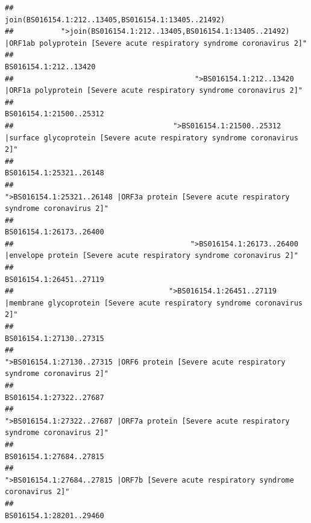 \documentclass[
]{article}
\begin{document}
\begin{verbatim}
##                                                                                    join(BS016154.1:212..13405,BS016154.1:13405..21492) 
##           ">join(BS016154.1:212..13405,BS016154.1:13405..21492) |ORF1ab polyprotein [Severe acute respiratory syndrome coronavirus 2]" 
##                                                                                                                  BS016154.1:212..13420 
##                                          ">BS016154.1:212..13420 |ORF1a polyprotein [Severe acute respiratory syndrome coronavirus 2]" 
##                                                                                                                BS016154.1:21500..25312 
##                                     ">BS016154.1:21500..25312 |surface glycoprotein [Severe acute respiratory syndrome coronavirus 2]" 
##                                                                                                                BS016154.1:25321..26148 
##                                            ">BS016154.1:25321..26148 |ORF3a protein [Severe acute respiratory syndrome coronavirus 2]" 
##                                                                                                                BS016154.1:26173..26400 
##                                         ">BS016154.1:26173..26400 |envelope protein [Severe acute respiratory syndrome coronavirus 2]" 
##                                                                                                                BS016154.1:26451..27119 
##                                    ">BS016154.1:26451..27119 |membrane glycoprotein [Severe acute respiratory syndrome coronavirus 2]" 
##                                                                                                                BS016154.1:27130..27315 
##                                             ">BS016154.1:27130..27315 |ORF6 protein [Severe acute respiratory syndrome coronavirus 2]" 
##                                                                                                                BS016154.1:27322..27687 
##                                            ">BS016154.1:27322..27687 |ORF7a protein [Severe acute respiratory syndrome coronavirus 2]" 
##                                                                                                                BS016154.1:27684..27815 
##                                                    ">BS016154.1:27684..27815 |ORF7b [Severe acute respiratory syndrome coronavirus 2]" 
##                                                                                                                BS016154.1:28201..29460 

\end{verbatim}
\end{document}
